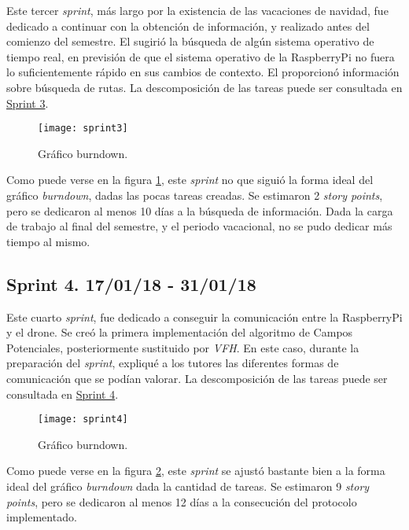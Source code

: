 Este tercer \emph{sprint}, más largo por la existencia de las vacaciones de navidad, fue dedicado a continuar con la obtención de información, y realizado antes del comienzo del semestre.
El \tutor{} sugirió la búsqueda de algún sistema operativo de tiempo real, en previsión de que el sistema operativo de la RaspberryPi no fuera lo suficientemente rápido en sus cambios de contexto.
El \cotutorTwo{} proporcionó información sobre búsqueda de rutas. 
La descomposición de las tareas puede ser consultada en \href{https://github.com/mbm0089/gii_0_17.02_snsi/milestone/3?closed=1}{Sprint 3}.

\begin{figure}[H]
	\centering
	\texttt{[image: sprint3]}
	\caption[Burndown Sprint 3]{Gráfico burndown.}\label{fig:sprint3}
\end{figure}

Como puede verse en la figura \ref{fig:sprint3}, este \emph{sprint} no que siguió la forma ideal del gráfico \emph{burndown}, dadas las pocas tareas creadas. 
Se estimaron 2 \emph{story points}, pero se dedicaron al menos 10 días a la búsqueda de información. Dada la carga de trabajo al final del semestre, y el periodo vacacional, no se pudo dedicar más tiempo al mismo.

\subsection{Sprint 4. 17/01/18 - 31/01/18}

Este cuarto \emph{sprint}, fue dedicado a conseguir la comunicación entre la RaspberryPi y el drone. Se creó la primera implementación del algoritmo de Campos Potenciales, posteriormente sustituido por \emph{VFH}.
En este caso, durante la preparación del \emph{sprint}, expliqué a los tutores las diferentes formas de comunicación que se podían valorar.
La descomposición de las tareas puede ser consultada en \href{https://github.com/mbm0089/gii_0_17.02_snsi/milestone/4?closed=1}{Sprint 4}.

\begin{figure}[H]
	\centering
	\texttt{[image: sprint4]}
	\caption[Burndown Sprint 4]{Gráfico burndown.}\label{fig:sprint4}
\end{figure}

Como puede verse en la figura \ref{fig:sprint4}, este \emph{sprint} se ajustó bastante bien a la forma ideal del gráfico \emph{burndown} dada la cantidad de tareas.
Se estimaron 9 \emph{story points}, pero se dedicaron al menos 12 días a la consecución del protocolo implementado.

